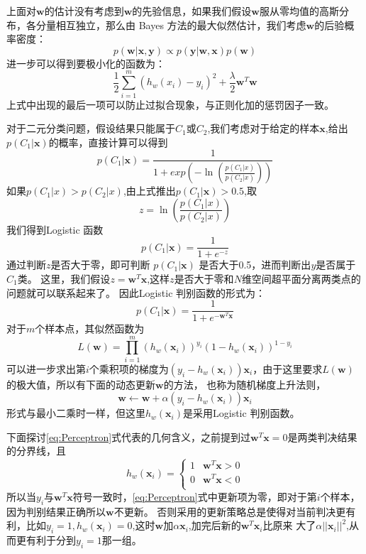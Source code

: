 \documentclass{article}
\begin{document}
上面对$\bm{w}$的估计没有考虑到$\bm{w}$的先验信息，如果我们假设$\bm{w}$服从零均值的高斯分布，各分量相互独立，那么由
Bayes 方法的最大似然估计，我们考虑$\bm{w}$的后验概率密度：
\begin{equation}
p(\bm{w}|\bm{x},\bm{y}) \propto p(\bm{y}|\bm{w},\bm{x}) p(\bm{w})
\end{equation}
进一步可以得到要极小化的函数为：
\begin{equation}
\frac{1}{2}\sum_{i=1}^m (h_w(x_i)-y_i)^2+\frac{\lambda}{2}\bm{w}^T\bm{w}
\end{equation}
上式中出现的最后一项可以防止过拟合现象，与正则化加的惩罚因子一致。

对于二元分类问题，假设结果只能属于$C_1$或$C_2$,我们考虑对于给定的样本$\bm{x}$,给出$p(C_1|\bm{x})$的概率，直接计算可以得到
\begin{equation}
p(C_1|\bm{x})=\frac{1}{1+exp(-\ln(\frac{p(C_1|x)}{p(C_2|x)}))}
\end{equation}
如果$p(C_1|x)>p(C_2|x)$,由上式推出$p(C_1|\bm{x})>0.5$,取
\begin{equation}
z=\ln(\frac{p(C_1|x)}{p(C_2|x)})
\end{equation}
我们得到Logistic 函数
\begin{equation}
p(C_1|\bm{x})=\frac{1}{1+e^{-z}}
\end{equation}
通过判断$z$是否大于零，即可判断 $p(C_1|\bm{x})$ 是否大于0.5，进而判断出$y$是否属于$C_1$类。
这里，我们假设$z=\bm{w}^T\bm{x}$,这样$z$是否大于零和$N$维空间超平面分离两类点的问题就可以联系起来了。
因此Logistic 判别函数的形式为：
\begin{equation}
p(C_1|\bm{x})=\frac{1}{1+e^{-\bm{w}^T\bm{x}}}
\end{equation}
对于$m$个样本点，其似然函数为
\begin{equation}
L(\bm{w})=\prod_{i=1}^m (h_w(\bm{x}_i))^{y_i} (1-h_w(\bm{x}_i))^{1-y_i}
\end{equation}
可以进一步求出第$i$个乘积项的梯度为$(y_i-h_w(\bm{x}_i))\bm{x}_i$，由于这里要求$L(\bm{w})$的极大值，所以有下面的动态更新$\bm{w}$的方法，
也称为随机梯度上升法则，
\begin{equation}\label{eq:Perceptron}
\bm{w} \leftarrow \bm{w}+\alpha (y_i-h_w(\bm{x}_i))\bm{x}_i
\end{equation}
形式与最小二乘时一样，但这里$h_w(\bm{x}_i)$是采用Logistic 判别函数。

下面探讨\eqref{eq:Perceptron}式代表的几何含义，之前提到过$\bm{w}^T\bm{x}=0$是两类判决结果的分界线，且
\begin{equation}
h_w(\bm{x}_i)=\begin{cases}
1 & \bm{w}^T\bm{x}>0\\
0 & \bm{w}^T\bm{x}<0 \\
\end{cases}
\end{equation}
所以当$y_i$与$\bm{w}^T\bm{x}$符号一致时，\eqref{eq:Perceptron}式中更新项为零，即对于第$i$个样本，因为判别结果正确所以$\bm{w}$不更新。
否则采用的更新策略总是使得对当前判决更有利，比如$y_i=1,h_w(\bm{x}_i)=0$,这时$\bm{w}$加$\alpha\bm{x}_i$,加完后新的$\bm{w}^T\bm{x}_i$比原来
大了$\alpha||\bm{x}_i||^2$,从而更有利于分到$y_i=1$那一组。
\end{document}

